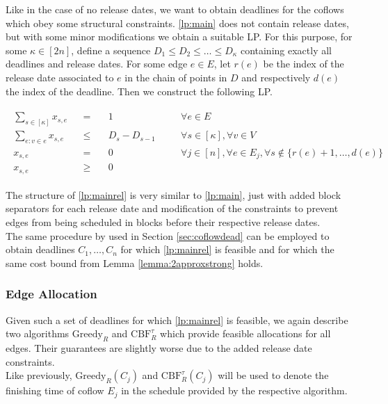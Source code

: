 \documentclass[11pt]{article}
\begin{document}
Like in the case of no release dates, we want to obtain deadlines for the coflows which obey some structural constraints. \ref{lp:main} does not contain release dates, but with some minor modifications we obtain a suitable LP. For this purpose, for some $\kappa \in [2n]$, define a sequence $D_1 \le D_2 \le \dotsc \le D_\kappa$ containing exactly all deadlines and release dates. For some edge $e \in E$, let $r(e)$ be the index of the release date associated to $e$ in the chain of points in $D$ and respectively $d(e)$ the index of the deadline. Then we construct the following LP.

\begin{gather*}\tag{LP $R$}\label{lp:mainrel}
\begin{aligned}
\sum_{s \in [\kappa]}x_{s,e} &&=& \quad 1 &&\forall e \in E\\
\sum_{e: v \in e} x_{s,e} &&\le& \quad D_s - D_{s-1}\quad &&\forall s \in [\kappa],\forall v \in V\\
x_{s,e} &&=& \quad 0 &&\forall j \in [n], \forall e \in E_j, \forall s \not\in \{r(e)+1,\dotsc,d(e)\} \quad\\
x_{s,e} &&\ge&\quad 0
\end{aligned}
\end{gather*}

The structure of \ref{lp:mainrel} is very similar to \ref{lp:main}, just with added block separators for each release date and modification of the constraints to prevent edges from being scheduled in blocks before their respective release dates.\\

The same procedure by \cite{im19} used in Section \ref{sec:coflowdead} can be employed to obtain deadlines $C_1,\dotsc,C_n$ for which \ref{lp:mainrel} is feasible and for which the same cost bound from Lemma \ref{lemma:2approxstrong} holds.

\subsubsection*{Edge Allocation}

Given such a set of deadlines for which \ref{lp:mainrel} is feasible, we again describe two algorithms $\mathrm{Greedy}_R$ and $\mathrm{CBF}^\tau_R$ which provide feasible allocations for all edges. Their guarantees are slightly worse due to the added release date constraints.\\
Like previously, $\mathrm{Greedy}_R(C_j)$ and $\mathrm{CBF}^\tau_R(C_j)$ will be used to denote the finishing time of coflow $E_j$ in the schedule provided by the respective algorithm.
\end{document}
